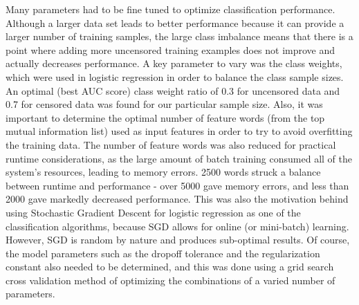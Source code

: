 \documentclass{article} %
\begin{document}
\begin{CJK*}{UTF8}{gbsn}
Many parameters had to be fine tuned to optimize classification performance. Although a larger data set leads to better performance because it can provide a larger number of training samples, the large class imbalance means that there is a point where adding more uncensored training examples does not improve and actually decreases performance. A key parameter to vary was the class weights, which were used in logistic regression in order to balance the class sample sizes. An optimal (best AUC score) class weight ratio of 0.3 for uncensored data and 0.7 for censored data was found for our particular sample size. Also, it was important to  determine the optimal number of feature words (from the top mutual information list) used as input features in order to try to avoid overfitting the training data. The number of feature words was also reduced for practical runtime considerations, as the large amount of batch training consumed all of the system's resources, leading to memory errors. 2500 words struck a balance between runtime and performance - over 5000 gave memory errors, and less than 2000 gave markedly decreased performance. This was also the motivation behind using Stochastic Gradient Descent for logistic regression as one of the classification algorithms, because SGD allows for online (or mini-batch) learning. However, SGD is random by nature and produces sub-optimal results. Of course, the model parameters such as the dropoff tolerance and the regularization constant also needed to be determined, and this was done using a grid search cross validation method of optimizing the combinations of a varied number of parameters.



\end{CJK*}
\end{document}
